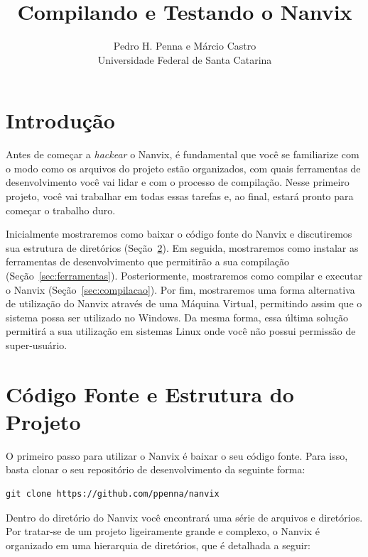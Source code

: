 \documentclass[11pt]{article}
\title{Compilando e Testando o Nanvix}
\author{Pedro H. Penna e Márcio Castro\\[0.3em]
\small Universidade Federal de Santa Catarina}
\date{}
\begin{document}
\maketitle

\noindent 


\section{Introdução}

Antes de começar a \textit{hackear} o Nanvix, é fundamental que você se familiarize com o modo como os arquivos do projeto estão organizados, com quais ferramentas de desenvolvimento você vai lidar e com o processo de compilação. Nesse primeiro projeto, você vai trabalhar em todas essas tarefas e, ao final, estará pronto para começar o trabalho duro.

Inicialmente mostraremos como baixar o código fonte do Nanvix e discutiremos sua estrutura de diretórios (Seção~\ref{sec:codigo}). Em seguida, mostraremos como instalar as ferramentas de desenvolvimento que permitirão a sua compilação (Seção~\ref{sec:ferramentas}). Posteriormente, mostraremos como compilar e executar o Nanvix (Seção~\ref{sec:compilacao}). Por fim, mostraremos uma forma alternativa de utilização do Nanvix através de uma Máquina Virtual, permitindo assim que o sistema possa ser utilizado no Windows. Da mesma forma, essa última solução permitirá a sua utilização em sistemas Linux onde você não possui permissão de super-usuário.

\section{Código Fonte e Estrutura do Projeto}
\label{sec:codigo}
O primeiro passo para utilizar o Nanvix é baixar o seu código fonte. Para isso, basta clonar o seu repositório de desenvolvimento da seguinte forma:

\begin{verbatim}
git clone https://github.com/ppenna/nanvix
\end{verbatim}

Dentro do diretório do Nanvix você encontrará uma série de arquivos e diretórios. Por tratar-se de um projeto ligeiramente grande e complexo, o Nanvix é organizado em uma hierarquia de diretórios, que é detalhada a seguir:
\end{document}

